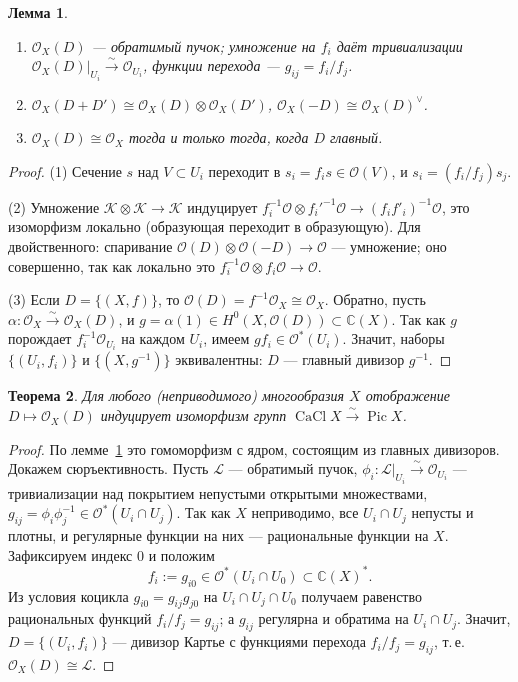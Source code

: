 \documentclass[11pt,a4paper]{article}
\theoremstyle{plain}
\newtheorem{theorem}{Теорема}[section]
\newtheorem{lemma}[theorem]{Лемма}
\theoremstyle{definition}
\theoremstyle{remark}
\renewcommand{\C}{\mathbb{C}}
\newcommand{\cO}{\mathcal{O}}
\newcommand{\cL}{\mathcal{L}}
\newcommand{\cK}{\mathcal{K}}
\DeclareMathOperator{\Pic}{Pic}
\DeclareMathOperator{\CaCl}{CaCl}
\begin{document}
\begin{lemma}\label{lem:OD}
\begin{enumerate}
\item $\cO_X(D)$ --- обратимый пучок; умножение на $f_i$ даёт тривиализации
$\cO_X(D)|_{U_i}\xrightarrow{\sim}\cO_{U_i}$, функции перехода --- $g_{ij}=f_i/f_j$.
\item $\cO_X(D+D')\cong\cO_X(D)\otimes\cO_X(D')$, $\cO_X(-D)\cong\cO_X(D)^\vee$.
\item $\cO_X(D)\cong\cO_X$ тогда и только тогда, когда $D$ главный.
\end{enumerate}
\end{lemma}
\begin{proof}
(1) Сечение $s$ над $V\subset U_i$ переходит в $s_i=f_is\in\cO(V)$, и $s_i=(f_i/f_j)s_j$.

(2) Умножение $\cK\otimes\cK\to\cK$ индуцирует
$f_i^{-1}\cO\otimes f_i'^{-1}\cO\to (f_if'_i)^{-1}\cO$, это изоморфизм локально (образующая
переходит в образующую). Для двойственного: спаривание $\cO(D)\otimes\cO(-D)\to\cO$ ---
умножение; оно совершенно, так как локально это $f_i^{-1}\cO\otimes f_i\cO\to\cO$.

(3) Если $D=\{(X,f)\}$, то $\cO(D)=f^{-1}\cO_X\cong\cO_X$. Обратно, пусть
$\alpha\colon\cO_X\xrightarrow\sim\cO_X(D)$, и $g=\alpha(1)\in H^0(X,\cO(D))\subset\C(X)$.
Так как $g$ порождает $f_i^{-1}\cO_{U_i}$ на каждом $U_i$, имеем $gf_i\in\cO^*(U_i)$. Значит, наборы
$\{(U_i,f_i)\}$ и $\{(X,g^{-1})\}$ эквивалентны: $D$ --- главный дивизор $g^{-1}$.
\end{proof}

\begin{theorem}\label{thm:CaCl=Pic}
Для любого (неприводимого) многообразия $X$ отображение $D\mapsto\cO_X(D)$ индуцирует изоморфизм
групп $\CaCl X\xrightarrow{\sim}\Pic X$.
\end{theorem}
\begin{proof}
По лемме~\ref{lem:OD} это гомоморфизм с ядром, состоящим из главных дивизоров. Докажем
сюръективность. Пусть $\cL$ --- обратимый пучок, $\phi_i\colon\cL|_{U_i}\xrightarrow\sim\cO_{U_i}$
--- тривиализации над покрытием непустыми открытыми множествами, $g_{ij}=\phi_i\phi_j^{-1}\in
\cO^*(U_i\cap U_j)$. Так как $X$ неприводимо, все $U_i\cap U_j$ непусты и плотны, и регулярные
функции на них --- рациональные функции на $X$. Зафиксируем индекс $0$ и положим
\[
f_i:=g_{i0}\in\cO^*(U_i\cap U_0)\subset\C(X)^*.
\]
Из условия коцикла $g_{i0}=g_{ij}g_{j0}$ на $U_i\cap U_j\cap U_0$ получаем равенство рациональных
функций $f_i/f_j=g_{ij}$; а $g_{ij}$ регулярна и обратима на $U_i\cap U_j$. Значит,
$D=\{(U_i,f_i)\}$ --- дивизор Картье с функциями перехода $f_i/f_j=g_{ij}$, т.\,е.
$\cO_X(D)\cong\cL$.
\end{proof}
\end{document}
